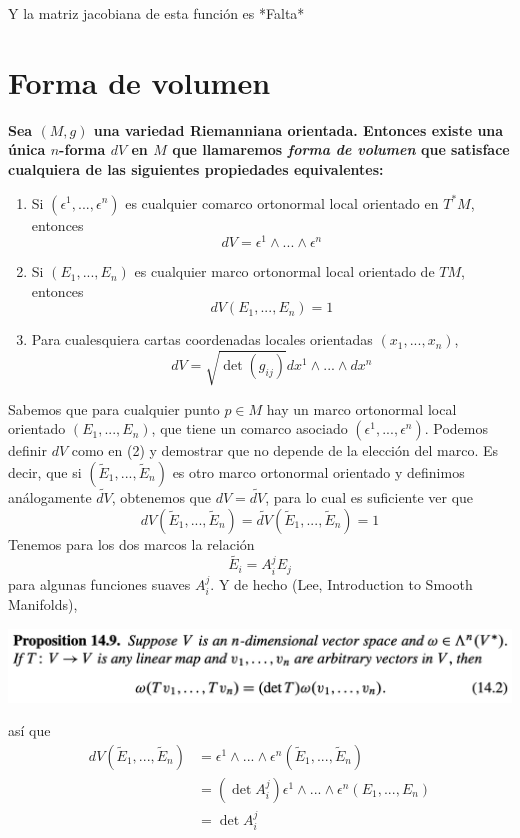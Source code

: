 \documentclass[11pt]{article}
\begin{document}
	Y la matriz jacobiana de esta función es *Falta*
	
	\newpage
	\section{Forma de volumen}
	\textbf{Sea $(M,g)$ una variedad Riemanniana orientada. Entonces existe una única $n$-forma $dV$ en $M$ que llamaremos \textit{forma de volumen} que satisface cualquiera de las siguientes propiedades equivalentes:}
	\begin{enumerate}[label={(\arabic*)}]
		\item Si $(\epsilon^1,...,\epsilon^n)$ es cualquier comarco ortonormal local orientado en $T^*M$, entonces
		$$dV=\epsilon^1\wedge...\wedge\epsilon^n$$
		\item Si $(E_1,...,E_n)$ es cualquier marco ortonormal local orientado de $TM$, entonces
		$$dV(E_1,...,E_n)=1$$
		\item Para cualesquiera cartas coordenadas locales orientadas $(x_1,...,x_n)$,
		$$dV=\sqrt{\det (g_{ij})}dx^1\wedge...\wedge dx^n$$
	\end{enumerate}
	Sabemos que para cualquier punto $p\in M$ hay un marco ortonormal local orientado $(E_1,...,E_n)$, que tiene un comarco asociado $(\epsilon^1,...,\epsilon^n)$. Podemos definir $dV$ como en (2) y demostrar que no depende de la elección del marco. Es decir, que si $(\widetilde{E}_1,...,\widetilde{E}_n)$ es otro marco ortonormal orientado y definimos análogamente $\widetilde{dV}$, obtenemos que $dV=\widetilde{dV}$, para lo cual es suficiente ver que 
	$$dV(\widetilde{E}_1,...,\widetilde{E}_n)=\widetilde{dV}(\widetilde{E}_1,...,\widetilde{E}_n)=1$$
	Tenemos para los dos marcos la relación
	$$\widetilde{E_i}=A^j_iE_j$$
	para algunas funciones suaves $A^j_i$. Y de hecho (Lee, Introduction to Smooth Manifolds),\par
	\hfill\break
	\centerline{\includegraphics[scale=0.8]{prop14.9.png}}
	así que
	\begin{align*}
		dV(\widetilde{E}_1,...,\widetilde{E}_n)&=\epsilon^1\wedge...\wedge\epsilon^n(\widetilde{E}_1,...,\widetilde{E}_n)\\
		&=(\det{A^j_i})\epsilon^1\wedge...\wedge\epsilon^n(E_1,...,E_n)\\
		&=\det{A^j_i}
	\end{align*}
\end{document}
